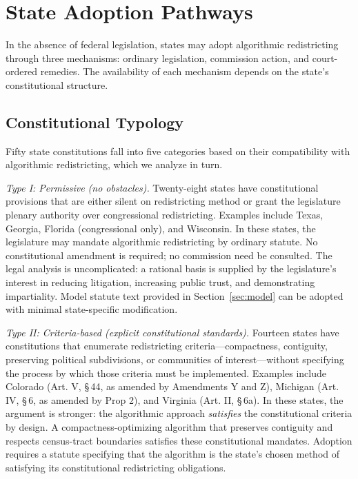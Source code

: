 \section{State Adoption Pathways}
\label{sec:state}

In the absence of federal legislation, states may adopt algorithmic redistricting through three mechanisms: ordinary legislation, commission action, and court-ordered remedies. The availability of each mechanism depends on the state's constitutional structure.

\subsection{Constitutional Typology}

Fifty state constitutions fall into five categories based on their compatibility with algorithmic redistricting, which we analyze in turn.

\textit{Type I: Permissive (no obstacles).} Twenty-eight states have constitutional provisions that are either silent on redistricting method or grant the legislature plenary authority over congressional redistricting. Examples include Texas, Georgia, Florida (congressional only), and Wisconsin. In these states, the legislature may mandate algorithmic redistricting by ordinary statute. No constitutional amendment is required; no commission need be consulted. The legal analysis is uncomplicated: a rational basis is supplied by the legislature's interest in reducing litigation, increasing public trust, and demonstrating impartiality. Model statute text provided in Section~\ref{sec:model} can be adopted with minimal state-specific modification.

\textit{Type II: Criteria-based (explicit constitutional standards).} Fourteen states have constitutions that enumerate redistricting criteria---compactness, contiguity, preserving political subdivisions, or communities of interest---without specifying the process by which those criteria must be implemented. Examples include Colorado (Art. V, \S\,44, as amended by Amendments Y and Z), Michigan (Art. IV, \S\,6, as amended by Prop 2), and Virginia (Art. II, \S\,6a). In these states, the argument is stronger: the algorithmic approach \textit{satisfies} the constitutional criteria by design. A compactness-optimizing algorithm that preserves contiguity and respects census-tract boundaries satisfies these constitutional mandates. Adoption requires a statute specifying that the algorithm is the state's chosen method of satisfying its constitutional redistricting obligations.

